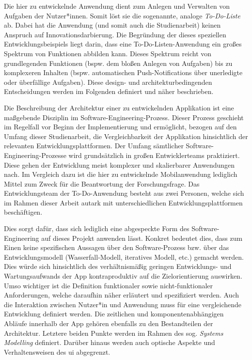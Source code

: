 Die hier zu entwickelnde Anwendung dient zum Anlegen und Verwalten von Aufgaben der Nutzer*innen. Somit löst sie die sogenannte, analoge \textit{To-Do-Liste} ab. Dabei hat die Anwendung (und somit auch die Studienarbeit) keinen Anspruch auf Innovationsdarbierung. Die Begründung der dieses speziellen Entwicklungsbeispiels liegt darin, dass eine To-Do-Listen-Anwendung ein großes Spektrum von Funktionen abbilden kann. Dieses Spektrum reicht von grundlegenden Funktionen (bspw. dem bloßen Anlegen von Aufgaben) bis zu komplexeren Inhalten (bspw. automatischen Push-Notifications über unerledigte oder überfällige Aufgaben). Diese design- und architekturbedingenden Entscheidungen werden im Folgenden definiert und näher beschrieben.

Die Beschreibung der Architektur einer zu entwickelnden Applikation ist eine maßgebende Disziplin im Software-Engineering-Prozess. Dieser Prozess geschieht im Regelfall vor Beginn der Implementierung und ermöglicht, bezogen auf den Umfang dieser Studienarbeit, die Vergleichbarkeit der Applikation hinsichtlich der relevanten Entwicklungsplattformen. Der Umfang sämtlicher Software-Engineering-Prozesse wird grundsätzlich in großen Entwicklerteams praktiziert. Diese gehen der Entwicklung meist komplexer und skalierbarer Anwendungen nach. Im Vergleich dazu ist die hier zu entwickelnde Mobilanwendung lediglich Mittel zum Zweck für die Beantwortung der Forschungsfrage. Das Entwicklungsteam der To-Do-Anwendung besteht aus zwei Personen, welche sich im Rahmen dieser Arbeit autark mit unterschiedlichen Entwicklungsplattformen beschäftigen. 

Dies sorgt dafür, dass sich lediglich eine abgespeckte Form des Software-Engineering auf dieses Projekt anwenden lässt. Konkret bedeutet dies, dass zum Einen keine spezifischen Aussagen über den Software-Prozess bzw. über das Entwicklungsmodell (Wasserfall-Modell, iteratives Modell, etc.) gemacht werden. Dies würde sich hinsichtlich des verhältnismäßig geringen Entwicklungs- und Wartungsaufwands der App kontraproduktiv auf die Zielorientierung auswirken. Umso wichtiger ist die Definition funktionaler sowie nicht-funktionaler Anforderungen, welche daraufhin näher erläutert und spezifiziert werden. Auch die Interaktion zwischen Nutzer*in und Anwendung muss für eine vergleichende Entwicklung definiert werden. Die zeitlichen und komponentenabhängigen Abläufe innerhalb der App gehören ebenfalls zu den Bestandteilen der Architektur. Letztere beiden Punkte werden im Rahmen des sog. \textit{Systems Modelling} definiert. Darüber hinaus werden auch optische Aspekte und Verhaltensweisen des \ac{ui} abgegrenzt.

